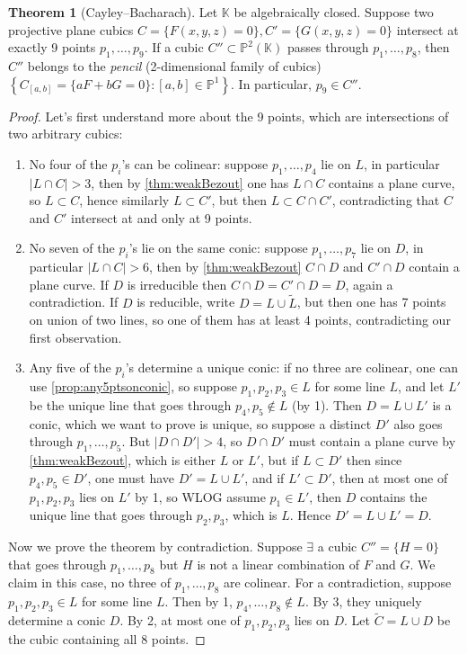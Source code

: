 \documentclass{article}
\newcommand{\K}{\mathbb{K}}
\newcommand{\p}{\mathbb{P}}
\theoremstyle{definition}
\newtheorem{thm}[defn]{Theorem}
\begin{document}
\begin{thm}[Cayley--Bacharach]
Let $\K$ be algebraically closed. Suppose two projective plane cubics $C=\{F(x,y,z)=0\},C'=\{G(x,y,z)=0\}$ intersect at exactly 9 points $p_1,\ldots,p_9$. If a cubic $C''\subset\p^2(\K)$ passes through $p_1,\ldots,p_8$, then $C''$ belongs to the \textit{pencil} (2-dimensional family of cubics) $\left\{C_{[a,b]}=\{aF+bG=0\}:[a,b]\in\p^1\right\}$. In particular, $p_9\in C''$.
\end{thm}
\begin{proof}
Let's first understand more about the 9 points, which are intersections of two arbitrary cubics:
\begin{enumerate}
\item No four of the $p_i$'s can be colinear: suppose $p_1,\ldots,p_4$ lie on $L$, in particular $|L\cap C|>3$, then by \ref{thm:weakBezout} one has $L\cap C$ contains a plane curve, so $L\subset C$, hence similarly $L\subset C'$, but then $L\subset C\cap C'$, contradicting that $C$ and $C'$ intersect at and only at 9 points.
\item No seven of the $p_i$'s lie on the same conic: suppose $p_1,\ldots,p_7$ lie on $D$, in particular $|L\cap C|>6$, then by \ref{thm:weakBezout} $C\cap D$ and $C'\cap D$ contain a plane curve. If $D$ is irreducible then $C\cap D=C'\cap D=D$, again a contradiction. If $D$ is reducible, write $D=L\cup\widetilde L$, but then one has 7 points on union of two lines, so one of them has at least 4 points, contradicting our first observation.
\item Any five of the $p_i$'s determine a unique conic: if no three are colinear, one can use \ref{prop:any5ptsonconic}, so suppose $p_1,p_2,p_3\in L$ for some line $L$, and let $L'$ be the unique line that goes through $p_4,p_5\notin L$ (by 1). Then $D=L\cup L'$ is a conic, which we want to prove is unique, so suppose a distinct $D'$ also goes through $p_1,\ldots,p_5$. But $|D\cap D'|>4$, so $D\cap D'$ must contain a plane curve by \ref{thm:weakBezout}, which is either $L$ or $L'$, but if $L\subset D'$ then since $p_4,p_5\in D'$, one must have $D'=L\cup L'$, and if $L'\subset D'$, then at most one of $p_1,p_2,p_3$ lies on $L'$ by 1, so WLOG assume $p_1\in L'$, then $D$ contains the unique line that goes through $p_2,p_3$, which is $L$. Hence $D'=L\cup L'=D$.
\end{enumerate}
Now we prove the theorem by contradiction. Suppose $\exists$ a cubic $C''=\{H=0\}$ that goes through $p_1,\ldots,p_8$ but $H$ is not a linear combination of $F$ and $G$. We claim in this case, no three of $p_1,\ldots,p_8$ are colinear. For a contradiction, suppose $p_1,p_2,p_3\in L$ for some line $L$. Then by 1, $p_4,\ldots,p_8\notin L$. By 3, they uniquely determine a conic $D$. By 2, at most one of $p_1,p_2,p_3$ lies on $D$. Let $\widetilde C=L\cup D$ be the cubic containing all 8 points.


\end{proof}
\end{document}
